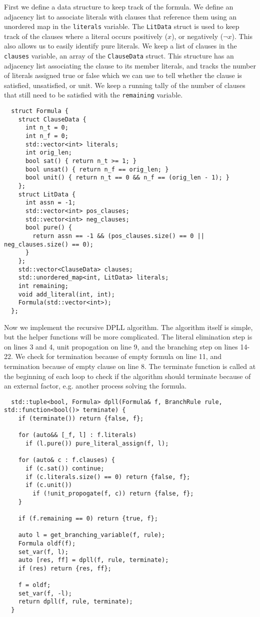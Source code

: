 \documentclass[10pt,AMS Euler]{article}
\begin{document}
First we define a data structure to keep track of the formula. We define an adjacency list to
associate literals with clauses that reference them using an unordered map in the \texttt{literals} variable.
The \texttt{LitData} struct is used to keep track of the clauses where a literal occurs positively (\(x\)),
or negatively (\(\neg x\)). This also allows us to easily identify pure literals. We keep a list of 
clauses in the \texttt{clauses} variable, an array of the \texttt{ClauseData} struct. This structure has an adjacency
list associating the clause to its member literals, and tracks the number of literals assigned true
or false which we can use to tell whether the clause is satisfied, unsatisfied, or unit.
We keep a running tally of the number of clauses that still need to be satisfied with the
\texttt{remaining} variable.
\begin{verbatim}
  struct Formula {
    struct ClauseData {
      int n_t = 0;
      int n_f = 0;
      std::vector<int> literals;
      int orig_len;
      bool sat() { return n_t >= 1; }
      bool unsat() { return n_f == orig_len; }
      bool unit() { return n_t == 0 && n_f == (orig_len - 1); }
    };
    struct LitData {
      int assn = -1;
      std::vector<int> pos_clauses;
      std::vector<int> neg_clauses;
      bool pure() {
        return assn == -1 && (pos_clauses.size() == 0 || neg_clauses.size() == 0);
      }
    };
    std::vector<ClauseData> clauses;
    std::unordered_map<int, LitData> literals;
    int remaining;
    void add_literal(int, int);
    Formula(std::vector<int>); 
  };
\end{verbatim}

Now we implement the recursive DPLL algorithm.
The algorithm itself is simple, but the helper functions will be more
complicated. The literal elimination step is on lines 3 and 4,
unit propogation on line 9, and the branching step on lines 14-22.
We check for termination because of empty formula on line 11, and termination
because of empty clause on line 8. The terminate function is called at the beginning
of each loop to check if the algorithm should terminate because of an external factor,
e.g. another process solving the formula.
\begin{verbatim}
  std::tuple<bool, Formula> dpll(Formula& f, BranchRule rule, std::function<bool()> terminate) {
    if (terminate()) return {false, f};
    
    for (auto&& [_f, l] : f.literals)
      if (l.pure()) pure_literal_assign(f, l);

    for (auto& c : f.clauses) {
      if (c.sat()) continue;
      if (c.literals.size() == 0) return {false, f};
      if (c.unit())
        if (!unit_propogate(f, c)) return {false, f};
    }

    if (f.remaining == 0) return {true, f};

    auto l = get_branching_variable(f, rule);
    Formula oldf(f);
    set_var(f, l);
    auto [res, ff] = dpll(f, rule, terminate);
    if (res) return {res, ff};

    f = oldf;
    set_var(f, -l);
    return dpll(f, rule, terminate);
  }
\end{verbatim}
\end{document}
